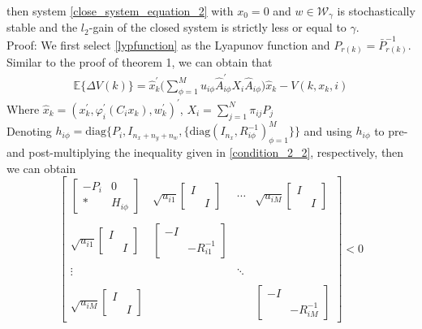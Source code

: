 \documentclass[conference]{IEEEtran}
\begin{document}
then system \eqref{close_system_equation_2}  with $x_0=0$ and $w\in\mathcal{W}_{\gamma}$ is stochastically stable and the $l_2$-gain of the closed system is strictly less or equal to $\gamma$.
\\
Proof: We first select \eqref{lypfunction} as the Lyapunov function and $P_{r(k)}=\bar{P}^{-1}_{r(k)}$. Similar to the proof of theorem 1, we can obtain that
\begin{equation}
	\begin{split}
		\mathbb{E}\{\varDelta V(k)\}=\hat{x}^{'}_{k} \Big( \sum_{\phi=1}^{M}u_{i\phi}\hat{A}^{'}_{i\phi}X_{i}\hat{A}_{i\phi}\Big) \hat{x}_{k} -V(k,x_k,i)
	\end{split}
\end{equation}
Where $\hat{x}_{k}=(x^{'}_{k},\varphi^{'}_{i}(C_{i}x_{k}),w^{'}_{k})^{'}$, $ X_{i}=\sum_{j=1}^{N}\pi_{ij}P_{j}$ \\
Denoting $h_{i\phi} = \mathrm{diag}\{P_{i}, I_{n_x+n_y+n_w},\{\mathrm{diag}(I_{n_x},R^{-1}_{i\phi})^{M}_{\phi=1} \} \}$ and using $h_{i\phi}$ to pre- and post-multiplying the inequality given in \eqref{condition_2_2}, respectively, then we can obtain \\
\begin{equation}\nonumber
\begin{bmatrix} 
\begin{bmatrix}
-P_{i}&0\\
*&H_{i\phi}
\end{bmatrix}&
\sqrt{u_{i1}}\begin{bmatrix}
I&\\
&I
\end{bmatrix}&
\cdots&
\sqrt{u_{iM}}\begin{bmatrix}
I&\\
&I
\end{bmatrix}\\ \\
\sqrt{u_{i1}}\begin{bmatrix}
I&\\
&I
\end{bmatrix}&
\begin{bmatrix}
-I&\\
&-R^{-1}_{i1}
\end{bmatrix}&\\ \\ \vdots&&\ddots\\ \\
\sqrt{u_{iM}}\begin{bmatrix}
I&\\
&I
\end{bmatrix}&&&
\begin{bmatrix}
-I&\\
&-R^{-1}_{iM}
\end{bmatrix}

\end{bmatrix} <0
\end{equation}
\end{document}
